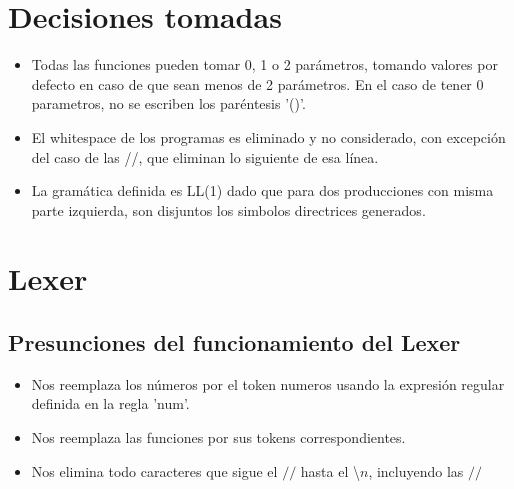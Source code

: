 \documentclass[a4paper]{article}
\begin{document}

\section{Decisiones tomadas}
\begin{itemize}
\item Todas las funciones  pueden tomar 0, 1 o 2 parámetros, tomando valores por defecto en caso de que sean menos de 2 parámetros. En el caso de tener 0 parametros, no se escriben los paréntesis '()'.

\item El whitespace de los programas es eliminado y no considerado, con excepción del caso de las //, que eliminan lo siguiente de esa línea.

\item La gramática definida es LL(1) dado que para dos producciones con misma parte izquierda, son disjuntos los simbolos directrices generados.
\end{itemize}

\section{Lexer}

\subsection{Presunciones del funcionamiento del Lexer }
\begin{itemize}
\item Nos reemplaza los números por el token numeros usando la expresión regular definida en la regla 'num'.
\item Nos reemplaza las funciones por sus tokens correspondientes.
\item Nos elimina todo caracteres que sigue el $//$ hasta el \textbackslash$n$, incluyendo las $//$
\end{itemize}
\end{document}
